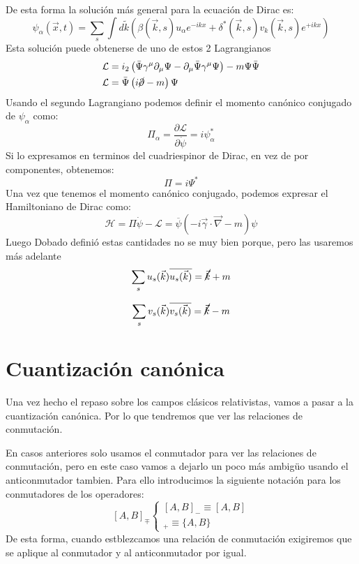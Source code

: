 De esta forma la solución más general para la ecuación de Dirac es:
$$
\psi_\alpha(\vec{x}, t)=\sum_s \int d \tilde{k}\left(\beta(\vec{k}, s) u_\alpha e^{-i k x}+\delta^*(\vec{k}, s) v_k(\vec{k}, s) e^{+i k x}\right)
$$
Esta solución puede obtenerse de uno de estos 2 Lagrangianos 
$$
\begin{aligned}
& \mathcal{L}=i_2\left(\bar{\Psi} \gamma^\mu \partial_\mu \Psi-\partial_\mu \bar{\Psi} \gamma^\mu \Psi\right)-m \Psi \bar{\Psi} \\
& \mathcal{L}=\bar{\Psi}\left(i \cancel{\partial}-m\right) \Psi
\end{aligned}
$$
Usando el segundo Lagrangiano podemos definir el momento canónico conjugado de $\psi_\alpha$ como:
$$
\Pi_\alpha=\frac{\partial \mathcal{L}}{\partial \dot{\psi}}=i \psi_\alpha^{*} $$
Si lo expresamos en terminos del cuadriespinor de Dirac, en vez de por componentes, obtenemos:
$$\Pi=i \Psi^*
$$
Una vez que tenemos el momento canónico conjugado, podemos expresar el Hamiltoniano de Dirac como:
$$
\mathcal{H}=\Pi \dot{\psi}-\mathcal{L}=\overline{\psi}(-i \vec{\gamma} \cdot \vec{\nabla}-m) \psi
$$
Luego Dobado definió estas cantidades no se muy bien porque, pero las usaremos más adelante
$$
\sum_s u_s(\vec{k}) \overline{u_s(\vec{k})}=\cancel{\vec{k}}+m
$$

$$
\sum_s v_s(\vec{k}) \overline{v_s(\vec{k})}=\cancel{\vec{k}}-m
$$


\section{Cuantización canónica}
Una vez hecho el repaso sobre los campos clásicos relativistas, vamos a pasar a la cuantización canónica. Por lo que tendremos que ver las relaciones de conmutación. 

En casos anteriores solo usamos el conmutador para ver las relaciones de conmutación, pero en este caso vamos a dejarlo un poco más ambigüo usando el anticonmutador tambien. Para ello introducimos la siguiente notación para los conmutadores de los operadores:
$$
[A, B]_{\mp}\left\{\begin{array}{c}
  [A, B]_{-}\equiv [A, B] \\
  [A, B]_{+}\equiv \{A, B\} 
  
\end{array}\right.
$$
De esta forma, cuando estblezcamos una relación de conmutación exigiremos que se aplique al conmutador y al anticonmutador por igual. 

